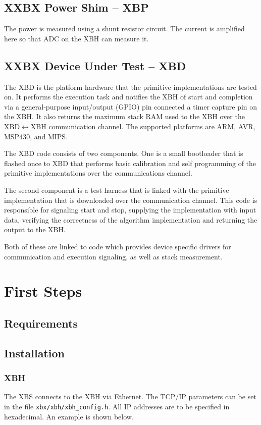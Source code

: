 \documentclass[twoside,11pt]{cergdoc}
\begin{document}
  \section{XXBX Power Shim -- XBP}
 The power is measured
using a shunt resistor circuit. The current is amplified
here so that ADC on the XBH can measure it.


  \section{XXBX Device Under Test -- XBD}
The XBD is the platform hardware that the primitive implementations are tested
on. It performs the execution task and
notifies the XBH of start and completion via a general-purpose input/output
(GPIO) pin connected a timer capture pin on the XBH. It also returns the maximum
stack RAM used to the XBH over the XBD$\leftrightarrow$XBH communication
    channel. The supported platforms are ARM, AVR, MSP430, and MIPS. 

The XBD code consists of two components. One is a small bootloader that is
flashed once to XBD that performs basic calibration and self programming of the
primitive implementations over the communications channel. 

The second component is a test harness that is linked with the
primitive implementation that is downloaded over the communication channel. This
code is responsible for signaling start and stop, supplying the implementation
with input data, verifying the correctness of the algorithm implementation and
returning the output to the XBH. 

Both of these are linked to code which provides device specific drivers for
communication and execution signaling, as well as stack measurement. 


\chapter{First Steps}
  \section{Requirements}
  \section{Installation}

    \subsection{XBH}
The XBS connects to the XBH via Ethernet. The TCP/IP parameters can be set
in the file \verb|xbx/xbh/xbh_config.h|. All IP addresses are to be specified
in hexadecimal. An example is shown below.
\end{document}

